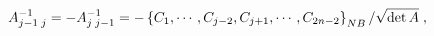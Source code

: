\begin{equation}
A_{j-1\;j}^{-1}=-A_{j\;j-1}^{-1}=-\left\{  C_{1},\cdots,C_{j-2},C_{j+1}%
,\cdots,C_{2n-2}\right\}  _{{\footnotesize NB}}/\sqrt{\det A}\;,
\end{equation}%
